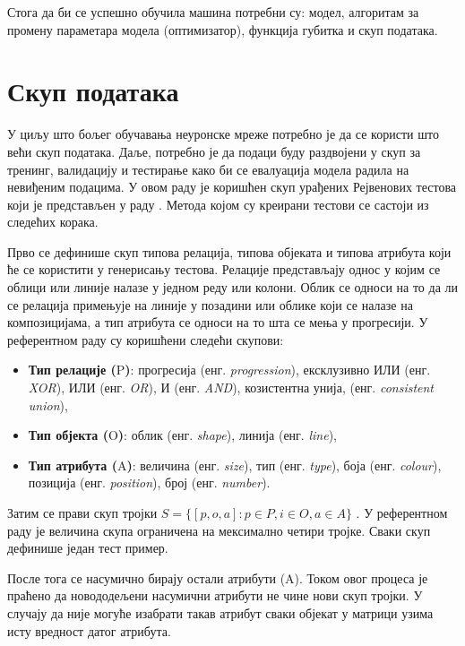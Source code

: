 \documentclass[a4paper, 12pt, master, utf8]{etf}
\begin{document}
Стога да би се успешно обучила машина потребни су: модел, алгоритам за промену параметара модела (оптимизатор), функција губитка и скуп података.

\section{Скуп података}
\label{sec:23}
У циљу што бољег обучавања неуронске мреже потребно је да се користи што већи скуп података. 
Даље, потребно је да подаци буду раздвојени у скуп за тренинг, валидацију и тестирање како би се евалуација 
модела радила на невиђеним подацима. У овом раду је коришћен скуп урађених Рејвенових тестова
који је представљен у раду \cite{barrett_measuring_2018}. Метода којом су креирани тестови се састоји из следећих корака.
\newline

Прво се дефинише скуп типова релација, типова објеката и типова атрибута који ће се користити у генерисању тестова. Релације представљају однос у којим се облици или линије налазе у једном реду или колони. 
Облик се односи на то да ли се релација примењује на линије у позадини или облике који се налазе на композицијама, а тип атрибута се односи на то шта се мења у прогресији.
У референтном раду су коришћени следећи скупови:

\begin{itemize}[noitemsep]
    \item  \textbf{Тип релације ($\mathrm{P}$)}: прогресија (енг. \textit{progression}), ексклузивно ИЛИ (енг. \textit{XOR}), ИЛИ (енг. \textit{OR}), И (енг. \textit{AND}), козистентна унија, (енг. \textit{consistent union}),
    \item  \textbf{Тип објекта ($\mathrm{O}$)}: облик (енг. \textit{shape}), линија (енг. \textit{line}),
    \item  \textbf{Тип атрибута ($\mathrm{A}$)}: величина (енг. \textit{size}), тип (енг. \textit{type}), боја (енг. \textit{colour}), позиција (енг. \textit{position}), број (енг. \textit{number}).
\end{itemize}

Затим се прави скуп тројки $S = \{[p, o, a]: p \in P, i \in O, a \in A\}$ . У референтном раду је величина скупа ограничена на мексимално четири тројке.
Сваки скуп дефинише један тест пример.
\newline

После тога се насумично бирају остали атрибути ($\mathrm{A}$). Током овог процеса је праћено да новододељени насумични атрибути не чине нови скуп тројки. У случају да није могуће изабрати такав атрибут сваки објекат у матрици узима исту вредност датог атрибута. 
\newline
\end{document}
